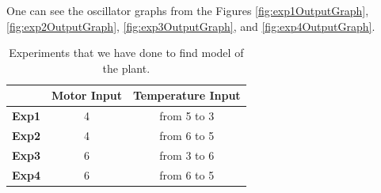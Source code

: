 \documentclass[11pt,a4paper,twocolumn]{article}
\begin{document}
One can see the oscillator graphs from the Figures \ref{fig:exp1OutputGraph}, \ref{fig:exp2OutputGraph}, \ref{fig:exp3OutputGraph}, and \ref{fig:exp4OutputGraph}.

\begin{table}[H]
    \centering 
    \begin{tabular}{|p{3em} c c |}
    \hline
    \rowcolor{WEBrown!40}
     & \textbf{Motor Input} & \textbf{Temperature Input} \T\B \\
    \hline \hline
    \textbf{Exp1} & 4 & from 5 to 3 \T\B \\
    \textbf{Exp2} & 4 & from 6 to 5 \T\B \\
    \textbf{Exp3} & 6 & from 3 to 6 \T\B \\
    \textbf{Exp4} & 6 & from 6 to 5 \T\B \\
    \hline
    \end{tabular}
    \\[10pt]
    \caption{Experiments that we have done to find model of the plant.}
    \label{table:experimentsParameters}
\end{table}
\end{document}
